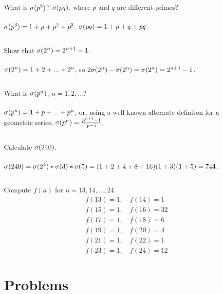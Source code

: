 \documentclass{article}
\begin{document}
\subsection{}
What is $\sigma(p^3)$? $\sigma(pq)$, where $p$ and $q$ are different primes?\\~\\
$\sigma(p^3) = 1 + p + p^2 + p^3$. $\sigma(pq) = 1 + p + q + pq$.

\subsection{}
Show that $\sigma(2^n) = 2^{n + 1} - 1$.\\~\\
$\sigma(2^n) = 1 + 2 + ... + 2^n$, so
$2\sigma(2^n) - \sigma(2^n) = \sigma(2^n) = 2^{n + 1} - 1$.

\subsection{}
What is $\sigma(p^n)$, $n = 1, 2, ...$?\\~\\
$\sigma(p^n) = 1 + p + ... + p^n$, or, using a well-known alternate defintion for
a geometric series, $\sigma(p^n) = \frac{p^{n + 1} - 1}{p - 1}$.

\subsection{}
Calculate $\sigma(240)$.\\~\\
$\sigma(240) = \sigma(2^4)*\sigma(3)*\sigma(5) = (1 + 2 + 4 + 8 + 16)(1 + 3)(1 + 5) = 744$.

\subsection{}
Compute $f(n)$ for $n = 13, 14, ..., 24$.
\begin{gather*}
    f(13) = 1, \quad f(14) = 1\\
    f(15) = 1, \quad f(16) = 32\\
    f(17) = 1, \quad f(18) = 6\\
    f(19) = 1, \quad f(20) = 4\\
    f(21) = 1, \quad f(22) = 1\\
    f(23) = 1, \quad f(24) = 12
\end{gather*}

\section{Problems}
\end{document}

